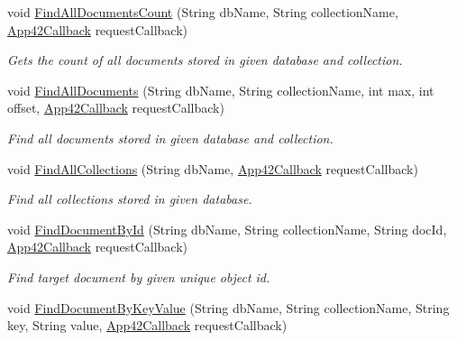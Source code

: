 \begin{DoxyCompactItemize}
void \hyperlink{classcom_1_1shephertz_1_1app42_1_1paas_1_1sdk_1_1windows_1_1storage_1_1_storage_service_a1cf46643e5da23ab44e2a401c1cca1bc}{Find\+All\+Documents\+Count} (String db\+Name, String collection\+Name, \hyperlink{interfacecom_1_1shephertz_1_1app42_1_1paas_1_1sdk_1_1windows_1_1_app42_callback}{App42\+Callback} request\+Callback)
\begin{DoxyCompactList}\small\item\em Gets the count of all documents stored in given database and collection. \end{DoxyCompactList}\item 
void \hyperlink{classcom_1_1shephertz_1_1app42_1_1paas_1_1sdk_1_1windows_1_1storage_1_1_storage_service_a2191b77be696603c89b55d8c4d4947c8}{Find\+All\+Documents} (String db\+Name, String collection\+Name, int max, int offset, \hyperlink{interfacecom_1_1shephertz_1_1app42_1_1paas_1_1sdk_1_1windows_1_1_app42_callback}{App42\+Callback} request\+Callback)
\begin{DoxyCompactList}\small\item\em Find all documents stored in given database and collection. \end{DoxyCompactList}\item 
void \hyperlink{classcom_1_1shephertz_1_1app42_1_1paas_1_1sdk_1_1windows_1_1storage_1_1_storage_service_a0ee7f50c2ccf8f099e1087fe781a153a}{Find\+All\+Collections} (String db\+Name, \hyperlink{interfacecom_1_1shephertz_1_1app42_1_1paas_1_1sdk_1_1windows_1_1_app42_callback}{App42\+Callback} request\+Callback)
\begin{DoxyCompactList}\small\item\em Find all collections stored in given database. \end{DoxyCompactList}\item 
void \hyperlink{classcom_1_1shephertz_1_1app42_1_1paas_1_1sdk_1_1windows_1_1storage_1_1_storage_service_a6fe6d0c97f0c71be3832a91d74cd4d1e}{Find\+Document\+By\+Id} (String db\+Name, String collection\+Name, String doc\+Id, \hyperlink{interfacecom_1_1shephertz_1_1app42_1_1paas_1_1sdk_1_1windows_1_1_app42_callback}{App42\+Callback} request\+Callback)
\begin{DoxyCompactList}\small\item\em Find target document by given unique object id. \end{DoxyCompactList}\item 
void \hyperlink{classcom_1_1shephertz_1_1app42_1_1paas_1_1sdk_1_1windows_1_1storage_1_1_storage_service_a3cd3771e8b7e59460487d7f85340b428}{Find\+Document\+By\+Key\+Value} (String db\+Name, String collection\+Name, String key, String value, \hyperlink{interfacecom_1_1shephertz_1_1app42_1_1paas_1_1sdk_1_1windows_1_1_app42_callback}{App42\+Callback} request\+Callback)

\end{DoxyCompactItemize}
